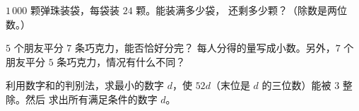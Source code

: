\begin{exercise}[$\star$]\label{exo:g5:division:9}
$1\,000$ 颗弹珠装袋，每袋装 $24$ 颗。能装满多少袋，
还剩多少颗？（除数是两位数。）
\end{exercise}

\begin{exercise}[$\star\star$]\label{exo:g5:division:10}
$5$ 个朋友平分 $7$ 条巧克力，能否恰好分完？
每人分得的量写成小数。另外，$7$ 个朋友平分
$5$ 条巧克力，情况有什么不同？
\end{exercise}

\begin{exercise}[$\star\star$]\label{exo:g5:division:11}
利用数字和的判别法，求最小的数字 $d$，使
$52d$（末位是 $d$ 的三位数）能被 $3$ 整除。然后
求出所有满足条件的数字 $d$。
\end{exercise}
